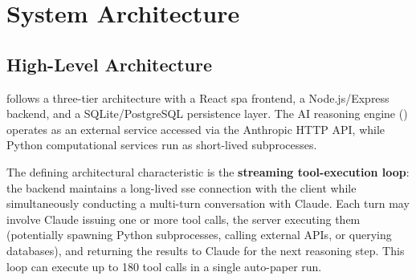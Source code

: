 \chapter{System Architecture}
\label{ch:architecture}

\section{High-Level Architecture}
\label{sec:arch:high-level}

\autoscholar follows a three-tier architecture with a React \gls{spa} frontend, a Node.js/Express backend, and a SQLite/PostgreSQL persistence layer.
The AI reasoning engine (\claude) operates as an external service accessed via the Anthropic HTTP API, while Python computational services run as short-lived subprocesses.

The defining architectural characteristic is the \textbf{streaming tool-execution loop}: the backend maintains a long-lived \gls{sse} connection with the client while simultaneously conducting a multi-turn conversation with Claude.
Each turn may involve Claude issuing one or more tool calls, the server executing them (potentially spawning Python subprocesses, calling external APIs, or querying databases), and returning the results to Claude for the next reasoning step.
This loop can execute up to 180 tool calls in a single auto-paper run.

